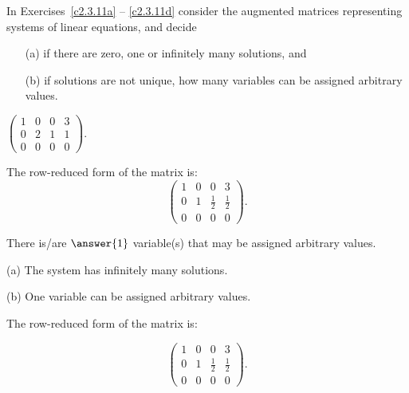 \documentclass{ximera}
\begin{document}
\noindent In Exercises~\ref{c2.3.11a} -- \ref{c2.3.11d} consider the
augmented matrices representing systems of linear equations, and decide
\begin{itemize}
\item[(a)] if there are zero, one or infinitely many solutions, and
\item[(b)] if solutions are not unique, how many variables can be
assigned arbitrary values.
\end{itemize}
\begin{exercise} \label{c2.3.11a}
$\left(\begin{array}{ccc|c} 1 & 0 & 0 &3 \\0 & 2 & 1 & 1\\ 0 & 0 & 0 & 0
       \end{array}\right)$.
     \begin{multipleChoice}
     \end{multipleChoice}
     \begin{hint}
       The row-reduced form of the matrix is:
\[
\left(\begin{array}{rrr|r} 1 & 0 & 0 & 3 \\ 0 & 1 &
\frac{1}{2} & \frac{1}{2} \\ 0 & 0 & 0 & 0\end{array}\right).
\]
     \end{hint}
     \begin{exercise}
       There is/are $\answer{1}$ variable(s) that may be assigned arbitrary values.

\begin{solution}

\ans (a) The system has infinitely many solutions.

(b) One variable can be assigned arbitrary values.

\soln The row-reduced form of the matrix is:

\[
\left(\begin{array}{rrr|r} 1 & 0 & 0 & 3 \\ 0 & 1 &
\frac{1}{2} & \frac{1}{2} \\ 0 & 0 & 0 & 0\end{array}\right).
\]

\end{solution}
     \end{exercise}

\begin{solution}


\end{solution}
\end{exercise}
\end{document}
